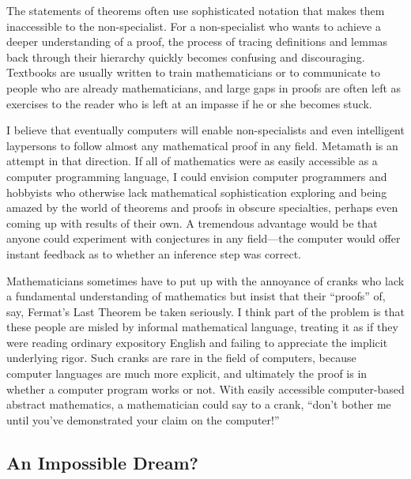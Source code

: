 The statements of theorems often use sophisticated notation that makes them
inaccessible to the non-specialist.  For a non-specialist who wants to achieve
a deeper understanding of a proof, the process of tracing definitions and
lemmas back through their hierarchy quickly becomes confusing
and discouraging.  Textbooks are usually written to train mathematicians or to
communicate to people who are already mathematicians, and large gaps in proofs
are often left as exercises to the reader who is left at an impasse if he or
she becomes stuck.

I believe that eventually computers will enable non-specialists and even
intelligent laypersons to follow almost any mathematical proof in any field.
Metamath is an attempt in that direction.  If all of mathematics were as
easily accessible as a computer programming language, I could envision
computer programmers and hobbyists who otherwise lack mathematical
sophistication exploring and being amazed by the world of theorems and proofs
in obscure specialties, perhaps even coming up with results of their own.  A
tremendous advantage would be that anyone could experiment with conjectures in
any field---the computer would offer instant feedback as to whether
an inference step was correct.

Mathematicians sometimes have to put up with the annoyance of
cranks who lack a fundamental understanding of mathematics but
insist that their ``proofs'' of, say, Fermat's Last Theorem be taken seriously.  I think part of the problem is that these
people are misled by informal mathematical language, treating it as if they
were reading ordinary expository English and failing to appreciate the
implicit underlying rigor.  Such cranks are rare in the field of computers,
because computer languages are much more explicit, and ultimately the proof is
in whether a computer program works or not.  With easily accessible
computer-based abstract mathematics, a mathematician could say to a crank,
``don't bother me until you've demonstrated your claim on the computer!''

\vspace{-0.5em}

\subsection{An Impossible Dream?}\label{dream}

